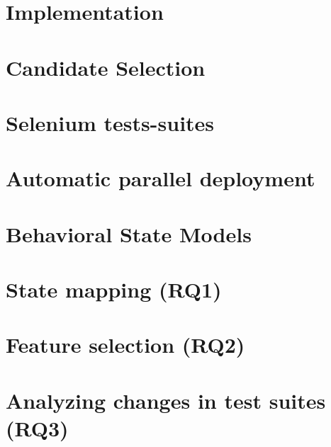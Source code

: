 \section{Implementation}
\label{Implement}
\section{Candidate Selection}
\section{Selenium tests-suites}
\section{Automatic parallel deployment}
\section{Behavioral State Models}
\section{State mapping (RQ1)}
\section{Feature selection (RQ2)}
\section{Analyzing changes in test suites (RQ3)}
